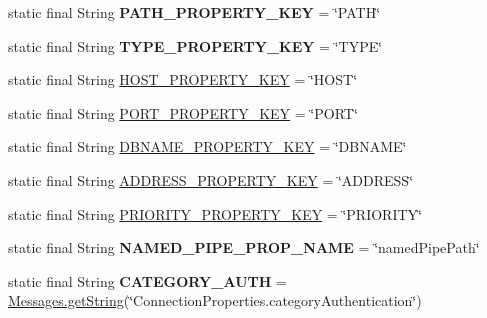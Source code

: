 \begin{DoxyCompactItemize}
static final String {\bfseries P\+A\+T\+H\+\_\+\+P\+R\+O\+P\+E\+R\+T\+Y\+\_\+\+K\+EY} = \char`\"{}P\+A\+TH\char`\"{}
\item 
\mbox{\label{classcom_1_1mysql_1_1cj_1_1conf_1_1_property_definitions_a8ac22af66f603b347a16813ea40c6709}} 
static final String {\bfseries T\+Y\+P\+E\+\_\+\+P\+R\+O\+P\+E\+R\+T\+Y\+\_\+\+K\+EY} = \char`\"{}T\+Y\+PE\char`\"{}
\item 
static final String \mbox{\hyperlink{classcom_1_1mysql_1_1cj_1_1conf_1_1_property_definitions_ada7cce64613fdd2ca055b77dfea2bc2b}{H\+O\+S\+T\+\_\+\+P\+R\+O\+P\+E\+R\+T\+Y\+\_\+\+K\+EY}} = \char`\"{}H\+O\+ST\char`\"{}
\item 
static final String \mbox{\hyperlink{classcom_1_1mysql_1_1cj_1_1conf_1_1_property_definitions_aa7ba552144b34b255e0687c1a8e764b0}{P\+O\+R\+T\+\_\+\+P\+R\+O\+P\+E\+R\+T\+Y\+\_\+\+K\+EY}} = \char`\"{}P\+O\+RT\char`\"{}
\item 
static final String \mbox{\hyperlink{classcom_1_1mysql_1_1cj_1_1conf_1_1_property_definitions_adc14d00146a8f70223433d0626a98352}{D\+B\+N\+A\+M\+E\+\_\+\+P\+R\+O\+P\+E\+R\+T\+Y\+\_\+\+K\+EY}} = \char`\"{}D\+B\+N\+A\+ME\char`\"{}
\item 
static final String \mbox{\hyperlink{classcom_1_1mysql_1_1cj_1_1conf_1_1_property_definitions_a253d8f60b8eea25d3c4ffab8f999c7c2}{A\+D\+D\+R\+E\+S\+S\+\_\+\+P\+R\+O\+P\+E\+R\+T\+Y\+\_\+\+K\+EY}} = \char`\"{}A\+D\+D\+R\+E\+SS\char`\"{}
\item 
static final String \mbox{\hyperlink{classcom_1_1mysql_1_1cj_1_1conf_1_1_property_definitions_a277a938c14096b7dc5eda6874029a839}{P\+R\+I\+O\+R\+I\+T\+Y\+\_\+\+P\+R\+O\+P\+E\+R\+T\+Y\+\_\+\+K\+EY}} = \char`\"{}P\+R\+I\+O\+R\+I\+TY\char`\"{}
\item 
\mbox{\label{classcom_1_1mysql_1_1cj_1_1conf_1_1_property_definitions_ad03d85afee4096d1aeb0bde451700aaa}} 
static final String {\bfseries N\+A\+M\+E\+D\+\_\+\+P\+I\+P\+E\+\_\+\+P\+R\+O\+P\+\_\+\+N\+A\+ME} = \char`\"{}named\+Pipe\+Path\char`\"{}
\item 
\mbox{\label{classcom_1_1mysql_1_1cj_1_1conf_1_1_property_definitions_ac7d239a3596b6002d5746399ee38a49b}} 
static final String {\bfseries C\+A\+T\+E\+G\+O\+R\+Y\+\_\+\+A\+U\+TH} = \mbox{\hyperlink{classcom_1_1mysql_1_1cj_1_1_messages_a86a388448aa7759254c491b3e1320d31}{Messages.\+get\+String}}(\char`\"{}Connection\+Properties.\+category\+Authentication\char`\"{})

\end{DoxyCompactItemize}
